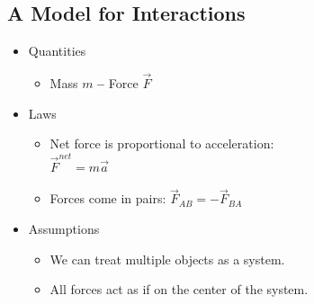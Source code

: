 \documentclass[]{article}
\begin{document}
\begin{PresentSpace}
\vspace{-10pt}
\section*{A Model for Interactions}
\vspace{-10pt}
\begin{itemize}
	\item Quantities
	\begin{itemize}
		\item Mass \quad $m$ \qquad \textbf{--} Force \quad $\vec{F}$
	\end{itemize}
	\item Laws
	\begin{itemize}
		\item Net force is proportional to acceleration: \\
		$\vec{F}^{net}=m\vec{a}$
		\item Forces come in pairs: $\vec{F}_{AB} = -\vec{F}_{BA}$
	\end{itemize}
	\item Assumptions
	\begin{itemize}
		\item We can treat multiple objects as a system.
		\item All forces act as if on the center of the system.
	\end{itemize}
\end{itemize}
\end{PresentSpace}
\newpage
\begin{TeacherMargin}

\end{TeacherMargin}
\end{document}
